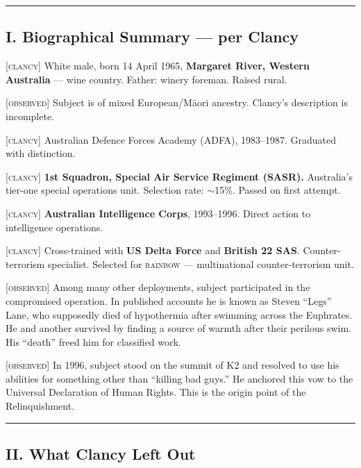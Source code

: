 \vspace{1cm}\hrule\vspace{1cm}

\subsection*{I. Biographical Summary --- per Clancy}
\label{record:hd-biographical-summary-per-clancy}

\textsc{[clancy]} White male, born 14 April 1965, \textbf{Margaret River, Western Australia} --- wine country. Father: winery foreman. Raised rural.

\textsc{[observed]} Subject is of mixed European/M\={a}ori ancestry. Clancy's description is incomplete.

\textsc{[clancy]} Australian Defence Forces Academy (ADFA), 1983--1987. Graduated with distinction.

\textsc{[clancy]} \textbf{1st Squadron, Special Air Service Regiment (SASR).} Australia's tier-one special operations unit. Selection rate: $\sim$15\%. Passed on first attempt.

\textsc{[clancy]} \textbf{Australian Intelligence Corps}, 1993--1996. Direct action to intelligence operations.

\textsc{[clancy]} Cross-trained with \textbf{US Delta Force} and \textbf{British 22 SAS}. Counter-terrorism specialist. Selected for \textsc{rainbow} --- multinational counter-terrorism unit.

\textsc{[observed]} Among many other deployments, subject participated in the compromised  operation. In published accounts he is known as Steven ``Legs'' Lane, who supposedly died of hypothermia after swimming across the Euphrates. He and another survived by finding a source of warmth after their perilous swim. His ``death'' freed him for classified work.

\textsc{[observed]} In 1996, subject stood on the summit of K2 and resolved to use his abilities for something other than ``killing bad guys.'' He anchored this vow to the Universal Declaration of Human Rights. This is the origin point of the Relinquishment.

\vspace{1cm}\hrule\vspace{1cm}

\subsection*{II. What Clancy Left Out}
\label{record:hd-what-clancy-left-out}


